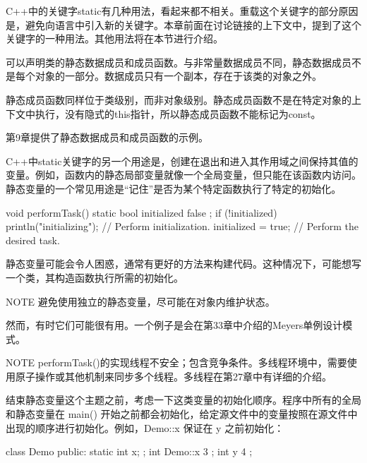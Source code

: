 
C++中的关键字static有几种用法，看起来都不相关。重载这个关键字的部分原因是，避免向语言中引入新的关键字。本章前面在讨论链接的上下文中，提到了这个关键字的一种用法。其他用法将在本节进行介绍。


可以声明类的静态数据成员和成员函数。与非常量数据成员不同，静态数据成员不是每个对象的一部分。数据成员只有一个副本，存在于该类的对象之外。

静态成员函数同样位于类级别，而非对象级别。静态成员函数不是在特定对象的上下文中执行，没有隐式的this指针，所以静态成员函数不能标记为const。

第9章提供了静态数据成员和成员函数的示例。


C++中static关键字的另一个用途是，创建在退出和进入其作用域之间保持其值的变量。例如，函数内的静态局部变量就像一个全局变量，但只能在该函数内访问。静态变量的一个常见用途是“记住”是否为某个特定函数执行了特定的初始化。

\begin{cpp}
void performTask()
{
    static bool initialized { false };
    if (!initialized) {
        println("initializing");
        // Perform initialization.
        initialized = true;
    }
    // Perform the desired task.
}
\end{cpp}

静态变量可能会令人困惑，通常有更好的方法来构建代码。这种情况下，可能想写一个类，其构造函数执行所需的初始化。

\begin{myNotic}{NOTE}
避免使用独立的静态变量，尽可能在对象内维护状态。
\end{myNotic}

然而，有时它们可能很有用。一个例子是会在第33章中介绍的Meyers单例设计模式。

\begin{myNotic}{NOTE}
performTask()的实现线程不安全；包含竞争条件。多线程环境中，需要使用原子操作或其他机制来同步多个线程。多线程在第27章中有详细的介绍。
\end{myNotic}


结束静态变量这个主题之前，考虑一下这类变量的初始化顺序。程序中所有的全局和静态变量在 main() 开始之前都会初始化，给定源文件中的变量按照在源文件中出现的顺序进行初始化。例如，Demo::x 保证在 y 之前初始化：

\begin{cpp}
class Demo
{
    public:
        static int x;
};
int Demo::x { 3 };
int y { 4 };
\end{cpp}

